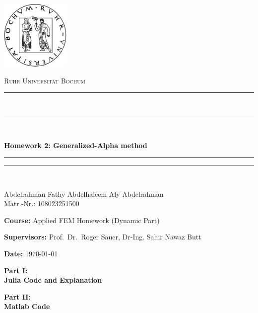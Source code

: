 \documentclass[a4paper,12pt]{article}
\newcommand{\HRuleThick}{\rule{\textwidth}{1.6pt}\vspace*{-\baselineskip}\vspace*{2pt}}
\newcommand{\HRuleThin}{\rule{\textwidth}{0.4pt}}
\newcommand{\sectiondivider}[1]{
  \cleardoublepage
  \thispagestyle{empty}
  \vspace*{\fill}
  \begin{center}
    \Huge\bfseries #1
  \end{center}
  \vspace*{\fill}
  \clearpage
}
\begin{document}
\begin{titlepage}
    \centering
    \vspace*{1cm}
    
    \includegraphics[width=0.25\textwidth]{rub.png}\par\vspace{1cm}
    
    {\scshape\LARGE Ruhr Universität Bochum \par}
    \vspace{2cm}
    
    \HRuleThick \\[0.001cm]
    \HRuleThin \\[0.2cm]
    {\huge\bfseries Homework 2: Generalized-Alpha method\par}
    \rule{\textwidth}{0.4pt}\vspace*{-\baselineskip}\vspace{3.2pt} %
	\rule{\textwidth}{1.6pt}\\[1.5cm] %
    
  
    {\Large Abdelrahman Fathy Abdelhaleem Aly Abdelrahman\\ Matr.-Nr.: 108023251500\par}
    \vfill
    
    
    \textbf{Course:} Applied FEM Homework (Dynamic Part)\par
    \textbf{Supervisors:} Prof.\ Dr.\ Roger Sauer, Dr-Ing. Sahir Nawaz Butt\par
    \textbf{Date:} \today
    
    \vfill
\end{titlepage}

\sectiondivider{Part I:\\ Julia Code and Explanation}


\sectiondivider{Part II:\\ Matlab Code}





\end{document}
